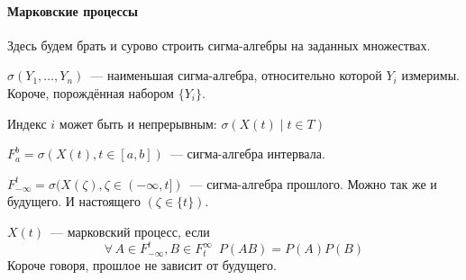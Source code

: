 \documentclass[12pt, timbord]{../../../notes}
\begin{document}
\paragraph{Марковские процессы} \label{par:proc::mark}
 
 Здесь будем брать и сурово строить сигма-алгебры на заданных множествах.
 \begin{defn}\label{defn:proc::mark::gensigma}
   $\sigma(Y_1, \dotsc, Y_n)$~--- наименьшая сигма-алгебра, относительно которой $Y_i$ измеримы. 
   Короче, порождённая набором $\{Y_i\}$.
 \end{defn}
 \begin{rem*}
   Индекс $i$ может быть и непрерывным: $\sigma(X(t) \mid t \in T)$
 \end{rem*}
 
 \begin{exmp}\label{exmp:proc::mark::sigint}
   $F_a^b = \sigma(X(t), t\in[a,b])$~--- сигма-алгебра интервала.
 \end{exmp}
 \begin{exmp}\label{exmp:proc::mark::sigpast}
   $F_{-\infty}^t = \sigma(X(\zeta), \zeta\in(-\infty, t])$~--- сигма-алгебра прошлого. Можно так же и
   будущего. И настоящего $(\zeta\in\{t\})$.
 \end{exmp}
 \begin{defn}\label{exmp:proc::mark::mark}
   $X(t)$~--- марковский процесс, если 
   \[
     \forall\, A\in F_{-\infty}^{t}, B \in F_{t}^\infty \;\: P(AB) = P(A) P(B)
   \]
   Короче говоря, прошлое не зависит от будущего.
 \end{defn}
\end{document}
